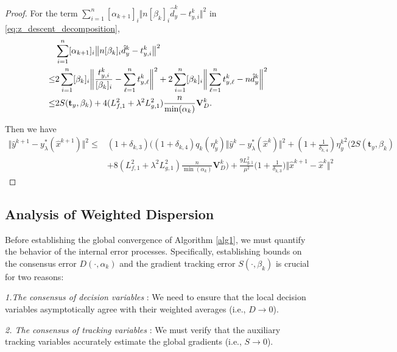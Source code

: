 \documentclass{article}
\theoremstyle{plain}
\theoremstyle{definition}
\theoremstyle{remark}
\begin{document}
\begin{proof}
    For the term $\sum_{i=1}^{n}[\alpha_{k+1}]_{i}\Big\Vert n[\beta_{k}]_{i}\hat{d}_{y}^{k}- t_{y,i}^{k} \Big\Vert^{2}$ in \eqref{eq:z_descent_decomposition},
	\begin{align}
		&\sum_{i=1}^{n}[\alpha_{k+1}]_{i}\big\Vert n[\beta_{k}]_{i}\hat{d}_{y}^{k}- t_{y,i}^{k} \big\Vert^{2} \notag\\
		\leq
		&2\sum_{i=1}^{n}[\beta_{k}]_{i}\bigg\Vert  \frac{t_{y,i}^{k}}{[\beta_{k}]_{i}} -\sum_{\ell=1}^{n}t_{y,\ell}^{k}\bigg\Vert^{2}+2\sum_{i=1}^{n}[\beta_{k}]_{i}\bigg\Vert \sum_{\ell=1}^{n}t_{y,\ell}^{k}-n\hat{d}_{y}^{k}\bigg\Vert^{2} \notag\\
		\leq
		&2S(\mathbf{t}_{y},\beta_{k})+4(L_{f,1}^{2}+\lambda^{2} L_{g,1}^{2})\frac{n}{\min(\alpha_{k})}\mathbf{V}_{D}^{k}.
	\end{align}

	Then we have 
	\begin{align*}
		\big\Vert\hat{y}^{k+1}-y_{\lambda}^*(\hat{x}^{k+1})\big\Vert^2
		\leq
		&(1+\delta_{k,3})\bigg((1+\delta_{k,4})q_{k}(\eta_{y}^{k})\big\Vert\hat{y}^{k}- y_{\lambda}^*(\hat{x}^{k})\big\Vert^{2}+(1+\frac{1}{\delta_{k,4}}){\eta_y^{k}}^{2}\big(2S(\mathbf{t}_{y},\beta_{k})\\
        &+8(L_{f,1}^{2}+\lambda^{2}L_{g,1}^{2})\frac{n}{\min(\alpha_{k})}\mathbf{V}_{D}^{k} \bigg)
        + \frac{9L_{g,1}^{2}}{\mu^{2}}\big(1+\frac{1}{\delta_{k,3}}\big)\big\Vert\hat{x}^{k+1}- \hat{x}^{k}\big\Vert^{2}
	\end{align*}
    \end{proof}
\subsection{Analysis of Weighted Dispersion} 
\label{app:fab_dispersion}

Before establishing the global convergence of Algorithm \ref{alg1}, we must quantify the behavior of the internal error processes. Specifically, establishing bounds on the consensus error $D(\cdot, \alpha_{k})$ and the gradient tracking error $S(\cdot, \beta_{k})$ is crucial for two reasons:

\noindent \textit{1.The consensus of decision variables }: We need to ensure that the local decision variables asymptotically agree with their weighted averages (i.e., $D \to 0$).

\noindent \textit{2. The consensus of tracking variables }: We must verify that the auxiliary tracking variables accurately estimate the global gradients (i.e., $S \to 0$).
\end{document}
